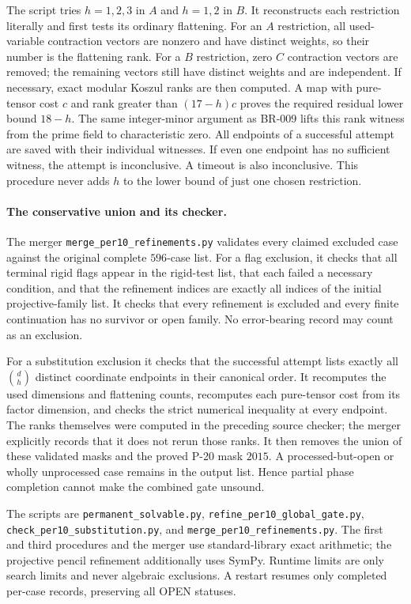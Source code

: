 The script tries $h=1,2,3$ in $A$ and $h=1,2$ in $B$.  It reconstructs
each restriction literally and first tests its ordinary flattening.
For an $A$ restriction, all used-variable contraction vectors are
nonzero and have distinct weights, so their number is the flattening
rank.  For a $B$ restriction, zero $C$ contraction vectors are removed;
the remaining vectors still have distinct weights and are independent.
If necessary, exact modular Koszul ranks are then computed.  A map
with pure-tensor cost $c$ and rank greater than $(17-h)c$ proves the
required residual lower bound $18-h$.  The same integer-minor argument
as BR-009 lifts this rank witness from the prime field to
characteristic zero.  All endpoints of a successful attempt are saved
with their individual witnesses.  If even one endpoint has no sufficient
witness, the attempt is inconclusive.  A timeout is also inconclusive.
This procedure never adds $h$ to the lower bound of just one chosen
restriction.

\paragraph{The conservative union and its checker.}
The merger \texttt{merge\_per10\_refinements.py} validates every
claimed excluded case against the original complete $596$-case list.
For a flag exclusion, it checks that all terminal rigid flags appear
in the rigid-test list, that each failed a necessary condition, and
that the refinement indices are exactly all indices of the initial
projective-family list.  It checks that every refinement is excluded
and every finite continuation has no survivor or open family.  No
error-bearing record may count as an exclusion.

For a substitution exclusion it checks that the successful attempt
lists exactly all $\binom dh$ distinct coordinate endpoints in their
canonical order.  It recomputes the used dimensions and flattening
counts, recomputes each pure-tensor cost from its factor dimension,
and checks the strict numerical inequality at every endpoint.  The
ranks themselves were computed in the preceding source checker;
the merger explicitly records that it does not rerun those ranks.
It then removes the union of these validated masks and the proved
P-20 mask $2015$.  A processed-but-open or wholly unprocessed case
remains in the output list.  Hence partial phase completion cannot
make the combined gate unsound.

The scripts are \texttt{permanent\_solvable.py},
\texttt{refine\_per10\_global\_gate.py},
\texttt{check\_per10\_substitution.py}, and
\texttt{merge\_per10\_refinements.py}.  The first and third procedures
and the merger use standard-library exact arithmetic; the projective
pencil refinement additionally uses SymPy.  Runtime limits are only
search limits and never algebraic exclusions.  A restart resumes
only completed per-case records, preserving all OPEN statuses.

